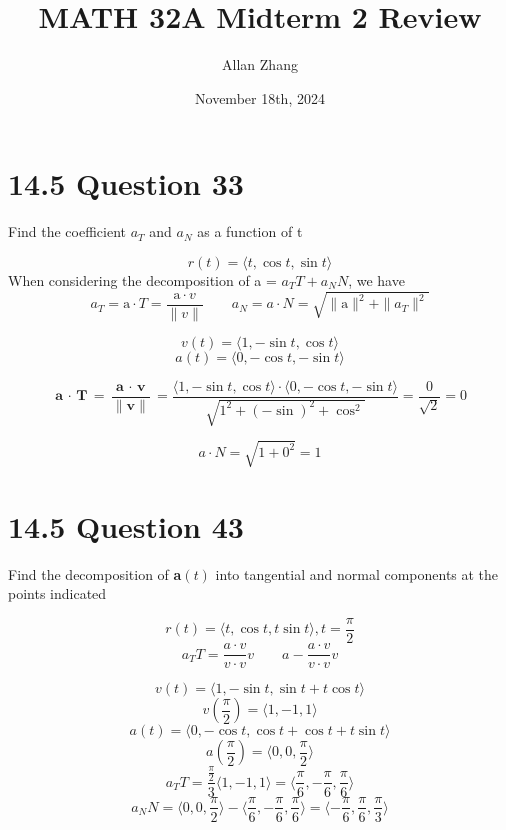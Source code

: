 \documentclass[hidelinks]{article}midterm2\
\title{\textbf{MATH 32A Midterm 2 Review}}
\author{Allan Zhang}
\date{November 18th, 2024}
\begin{document}
\hypersetup{bookmarksnumbered=true,}
\pagecolor{white}
\color{black}
\maketitle

\section{14.5 Question 33}
Find the coefficient $a_T$ and $a_N$ as a function of t 

\[
	r(t) = \langle t, \cos t, \sin t \rangle
\]
When considering the decomposition of a = $a_TT + a_NN$, we have 
\[
	a_T = \text{a} \cdot T = \frac{\text{a} \cdot v}{\|v\|} \quad \quad
	a_N = a \cdot N = \sqrt{\| \text{a} \|^2 + \|a_T\|^2}
\]

\[
	v(t) = \langle 1, -\sin t, \cos t \rangle 
\]
\[
	a(t) = \langle 0, -\cos t, -\sin t \rangle
\]

\[
	\textbf{a $\cdot$ T} = \frac{\textbf{a $\cdot$ v}}{\|\textbf{v}\|} = \frac{\langle 1, -\sin t, \cos t \rangle \cdot \langle 0, -\cos t, -\sin t \rangle}{ \sqrt{1^2 + (-\sin)^2 + \cos^2}} = \frac{0}{\sqrt{2}} = 0
\]

\[
	a \cdot N = \sqrt{1 + 0^2} = 1
\]

\section{14.5 Question 43}
Find the decomposition of \textbf{a}$(t)$ into tangential and normal components at the points indicated 

\[
	r(t) = \langle t, \cos t, t \sin t \rangle, t = \frac{\pi}{2}
\]
\[
	a_TT = \frac{a \cdot v }{v\cdot v} v \quad \quad a - \frac{a \cdot v }{v\cdot v} v
\]

\[
	v(t) = \langle 1, -\sin t, \sin t + t \cos t \rangle 
\]
\[
	v(\frac{\pi}{2}) = \langle 1, -1, 1 \rangle
\]
\[
	a(t) = \langle 0, -\cos t, \cos t + \cos t + t\sin t \rangle
\]
\[
	a(\frac{\pi}{2}) = \langle 0, 0, \frac{\pi}{2} \rangle
\]
\[
	a_TT = \frac{\frac{\pi}{2}}{3} \langle 1, -1, 1 \rangle = \langle \frac{\pi}{6}, -\frac{\pi}{6}, \frac{\pi}{6} \rangle
\]
\[
	a_NN = \langle 0, 0, \frac{\pi}{2} \rangle - \langle \frac{\pi}{6}, -\frac{\pi}{6}, \frac{\pi}{6} \rangle = \langle -\frac{\pi}{6}, \frac{\pi}{6}, \frac{\pi}{3} \rangle 
\]
\end{document}
